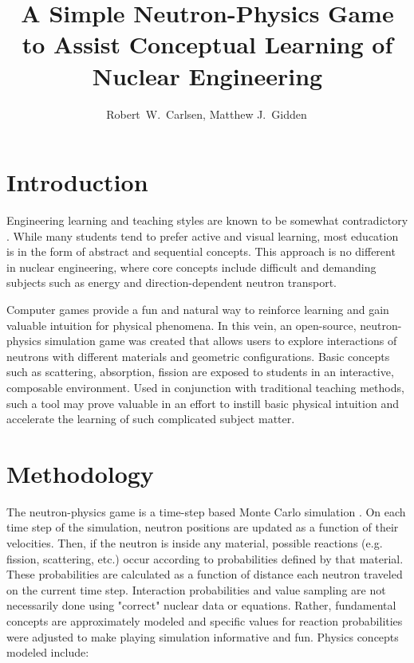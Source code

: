 \documentclass{anstrans}
\title{A Simple Neutron-Physics Game to Assist Conceptual Learning of Nuclear
  Engineering}
\author{Robert~W.~Carlsen, Matthew J.~Gidden$^{\*}$}
\institute{
University of Wisconsin, Nuclear Engineering Dept., 1500 Engineering Dr., Madison, WI
}
\begin{document}
\section{Introduction}

Engineering learning and teaching styles are known to be somewhat
contradictory \cite{felder2000learning}. While many students tend to prefer
active and visual learning, most education is in the form of abstract and
sequential concepts. This approach is no different in nuclear engineering,
where core concepts include difficult and demanding subjects such as energy
and direction-dependent neutron transport. 

Computer games provide a fun and natural way to reinforce learning and gain
valuable intuition for physical phenomena. In this vein, an open-source,
neutron-physics simulation game was created \cite{Carlsen2015} that allows users
to explore interactions of neutrons with different materials and geometric
configurations. Basic concepts such as scattering, absorption, fission are
exposed to students in an interactive, composable environment. Used in
conjunction with traditional teaching methods, such a tool may prove valuable in
an effort to instill basic physical intuition and accelerate the learning of
such complicated subject matter.

\section{Methodology}

The neutron-physics game is a time-step based Monte Carlo simulation
\cite{lewis1984computational}. On each time step of the simulation, neutron
positions are updated as a function of their velocities.  Then, if the neutron
is inside any material, possible reactions (e.g. fission, scattering, etc.)
occur according to probabilities defined by that material.  These
probabilities are calculated as a function of distance each neutron traveled
on the current time step.  Interaction probabilities and value sampling are
not necessarily done using "correct" nuclear data or equations.  Rather,
fundamental concepts are approximately modeled and specific values for
reaction probabilities were adjusted to make playing simulation informative
and fun.  Physics concepts modeled include:
\end{document}
